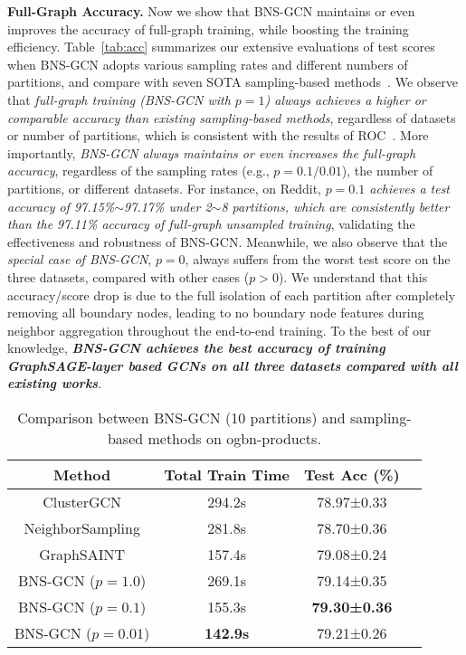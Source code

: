 \documentclass{article}
\newcommand{\niparagraph}[1]{\noindent\textbf{#1}}
\begin{document}
\niparagraph{Full-Graph Accuracy.}
Now we show that BNS-GCN maintains or even improves the accuracy of full-graph training, while boosting the training efficiency.
Table~\ref{tab:acc} summarizes our extensive evaluations of test scores when BNS-GCN adopts various sampling rates and different numbers of partitions, and compare with seven SOTA sampling-based methods~\citep{hu2020open, redditacc2020paperwithcode,chiang2019cluster,chen2018stochastic,zeng2019graphsaint,hamilton2017inductive,cong2020minimal,liu2022exact,zou2019layer,chen2020scalable}.
We observe that \textit{full-graph training (BNS-GCN with $p=1$) always achieves a higher or comparable accuracy than existing sampling-based methods}, regardless of datasets or number of partitions, which is consistent with the results of ROC~\citep{jia2020improving}.
More importantly, \textit{BNS-GCN always maintains or even increases the full-graph accuracy}, regardless of the sampling rates (e.g., $p=0.1/0.01$), the number of partitions, or different datasets.
For instance, on Reddit, \textit{$p=0.1$ achieves a test accuracy of 97.15\%$\sim$97.17\% under 2$\sim$8 partitions, which are consistently better than the 97.11\% accuracy of full-graph unsampled training}, validating the effectiveness and robustness of BNS-GCN.
Meanwhile, we also observe that the \textit{special case of BNS-GCN}, $p=0$, always suffers from the worst test score on the three datasets, compared with other cases ($p>0$). We understand that this accuracy/score drop is due to the full isolation of each partition after completely removing all boundary nodes, leading to no boundary node features during neighbor aggregation throughout the end-to-end training.
To the best of our knowledge, \textbf{\textit{BNS-GCN achieves the best accuracy of training GraphSAGE-layer based GCNs on all three datasets compared with all existing works}}. 



\begin{table}[t]
\centering
\caption{Comparison between BNS-GCN (10 partitions) and sampling-based methods on ogbn-products.}
\setlength{\tabcolsep}{0.4em}
\label{tab:cmp_samp}
\begin{tabular}{c|ccc}
\hline
Method & Total Train Time & Test Acc (\%) \\
\hline
ClusterGCN & 294.2s & 78.97±0.33 \\
NeighborSampling & 281.8s & 78.70±0.36 \\
GraphSAINT & 157.4s & 79.08±0.24 \\
\hline
BNS-GCN ($p=1.0$) & 269.1s & 79.14±0.35 \\
BNS-GCN ($p=0.1$) & 155.3s & \textbf{79.30±0.36} \\
BNS-GCN ($p=0.01$) & \textbf{142.9s} & 79.21±0.26 \\
\hline
\end{tabular}
\end{table}
\end{document}
